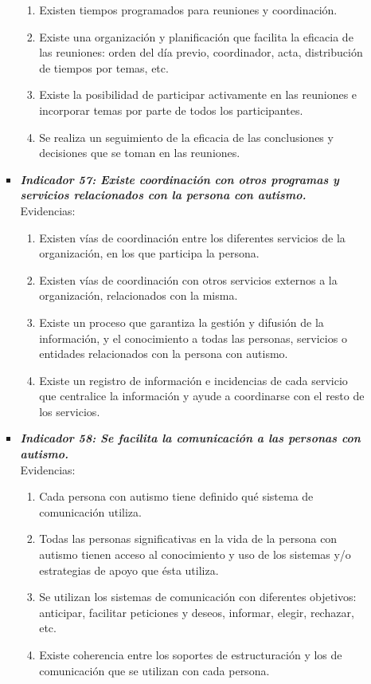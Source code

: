 \begin{itemize}
\begin{itemize}
\begin{itemize}
			\begin{enumerate}
				\item Existen tiempos programados para reuniones y coordinación. 
				\item Existe una organización y planificación que facilita la eficacia de las reuniones: orden del día previo, coordinador, acta, distribución de tiempos por temas, etc. 
				\item Existe la posibilidad de participar activamente en las reuniones e incorporar temas por parte de todos los participantes. 
				\item Se realiza un seguimiento de la eficacia de las conclusiones y decisiones que se toman en las reuniones. 
			\end{enumerate}
			\item \textbf{\textit{Indicador 57: Existe coordinación con otros programas y servicios relacionados con la persona con autismo.}}\\Evidencias:
			
			\begin{enumerate}
				\item Existen vías de coordinación entre los diferentes servicios de la organización, en los que participa la persona.  
				\item Existen vías de coordinación con otros servicios externos a la organización, relacionados con la misma.       
				\item Existe un proceso que garantiza la gestión y difusión de la información, y el conocimiento a todas las personas, servicios o entidades relacionados con la persona con autismo. 
				\item Existe un registro de información e incidencias de cada servicio que centralice la información y ayude a coordinarse con el resto de los servicios. 
			\end{enumerate}
			\item \textbf{\textit{Indicador 58: Se facilita la comunicación a las personas con autismo.}}\\Evidencias:
			
			\begin{enumerate}
				\item Cada persona con autismo tiene definido qué sistema de comunicación utiliza. 
				\item Todas las personas significativas en la vida de la persona con autismo tienen acceso al conocimiento y uso de los sistemas y/o estrategias de apoyo que ésta utiliza. 
				\item Se utilizan los sistemas de comunicación con diferentes objetivos: anticipar, facilitar peticiones y deseos, informar, elegir, rechazar, etc. 
				\item Existe coherencia entre los soportes de estructuración y los de comunicación que se utilizan con cada persona.
			\end{enumerate}
		\end{itemize}
		

\end{itemize}
\end{itemize}
